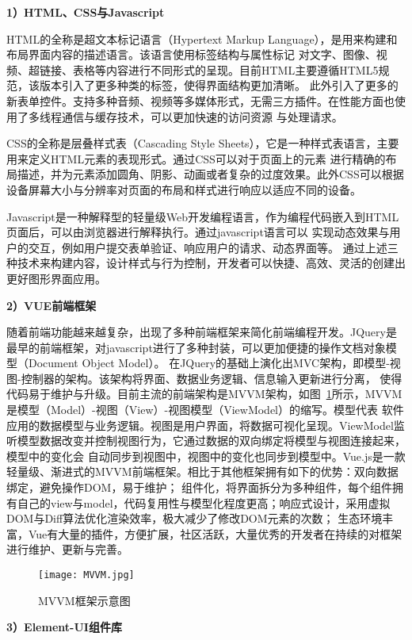 \textbf{1）HTML、CSS与Javascript}

HTML的全称是超文本标记语言（Hypertext Markup Language），是用来构建和布局界面内容的描述语言。该语言使用标签结构与属性标记
对文字、图像、视频、超链接、表格等内容进行不同形式的呈现。目前HTML主要遵循HTML5规范，该版本引入了更多种类的标签，使得界面结构更加清晰。
此外引入了更多的新表单控件。支持多种音频、视频等多媒体形式，无需三方插件。在性能方面也使用了多线程通信与缓存技术，可以更加快速的访问资源
与处理请求。

CSS的全称是层叠样式表（Cascading Style Sheets），它是一种样式表语言，主要用来定义HTML元素的表现形式。通过CSS可以对于页面上的元素
进行精确的布局描述，并为元素添加圆角、阴影、动画或者复杂的过度效果。此外CSS可以根据设备屏幕大小与分辨率对页面的布局和样式进行响应以适应不同的设备。

Javascript是一种解释型的轻量级Web开发编程语言，作为编程代码嵌入到HTML页面后，可以由浏览器进行解释执行。通过javascript语言可以
实现动态效果与用户的交互，例如用户提交表单验证、响应用户的请求、动态界面等。
通过上述三种技术来构建内容，设计样式与行为控制，开发者可以快捷、高效、灵活的创建出更好图形界面应用。

\textbf{2）VUE前端框架}

随着前端功能越来越复杂，出现了多种前端框架来简化前端编程开发。JQuery是最早的前端框架，对javascript进行了多种封装，可以更加便捷的操作文档对象模型（Document Object Model）。
在JQuery的基础上演化出MVC架构，即模型-视图-控制器的架构。该架构将界面、数据业务逻辑、信息输入更新进行分离，
使得代码易于维护与升级。目前主流的前端架构是MVVM架构，如图~\ref{fig:mvvm}所示，MVVM是模型（Model）-视图（View）-视图模型（ViewModel）的缩写。模型代表
软件应用的数据模型与业务逻辑。视图是用户界面，将数据可视化呈现。ViewModel监听模型数据改变并控制视图行为，它通过数据的双向绑定将模型与视图连接起来，模型中的变化会
自动同步到视图中，视图中的变化也同步到模型中。Vue.js\cite{nelson2018getting}是一款轻量级、渐进式的MVVM前端框架。相比于其他框架拥有如下的优势：双向数据绑定，避免操作DOM，易于维护；
组件化，将界面拆分为多种组件，每个组件拥有自己的view与model，代码复用性与模型化程度更高；响应式设计，采用虚拟DOM与Diff算法优化渲染效率，极大减少了修改DOM元素的次数；
生态环境丰富，Vue有大量的插件，方便扩展，社区活跃，大量优秀的开发者在持续的对框架进行维护、更新与完善。

\begin{figure}[htbp]
  \centering
  \texttt{[image: MVVM.jpg]}
  \caption{MVVM框架示意图}
  \label{fig:mvvm}
\end{figure}

\textbf{3）Element-UI组件库}

